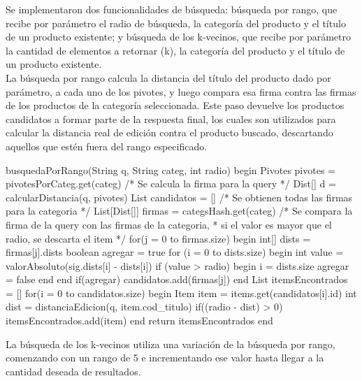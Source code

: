 Se implementaron dos funcionalidades de b\'usqueda: b\'usqueda por rango, que recibe por par\'ametro el radio de b\'usqueda, la categor\'ia del producto y el t\'itulo de un producto existente; y b\'usqueda de los k-vecinos, que recibe por par\'ametro la cantidad de elementos a retornar (k), la categor\'ia del producto y el t\'itulo de un producto existente.\\

La b\'usqueda por rango calcula la distancia del t\'itulo del producto dado por par\'ametro, a cada uno de los pivotes, y luego compara esa firma contra las firmas de los productos de la categor\'ia seleccionada. Este paso devuelve los productos candidatos a formar parte de la respuesta final, los cuales son utilizados para calcular la distancia real de edici\'on contra el producto buscado, descartando aquellos que est\'en fuera del rango especificado.\\

\begin{algorithm}[caption={B\'usqueda por rango}, label={alg4}]
busquedaPorRango(String q, String categ, int radio)
begin
 Pivotes pivotes = pivotesPorCateg.get(categ)
 /* Se calcula la firma para la query */
 Dist[] d = calcularDistancia(q, pivotes)
 List candidatos = []
 /* Se obtienen todas las firmas para la categoria */
 List[Dist[]] firmas = categsHash.get(categ)
 /* Se compara la firma de la query con las firmas de la categoria, 
  * si el valor es mayor que el radio, se descarta el item */
 for(j = 0 to firmas.size)
 begin
  int[] dists = firmas[j].dists
  boolean agregar = true
  for (i = 0 to dists.size)
  begin
   int value = valorAbsoluto(sig.dists[i] - dists[i])
   if (value > radio)
   begin
    i = dists.size
    agregar = false
   end
  end
  if(agregar)
   candidatos.add(firmas[j])
 end
 List itemsEncontrados = []
 for(i = 0 to candidatos.size)
 begin
  Item item = items.get(candidatos[i].id)
  int dist = distanciaEdicion(q, item.cod_titulo)
  if((radio - dist) > 0)
   itemsEncontrados.add(item)
 end
 return itemsEncontrados
end
\end{algorithm}

La b\'usqueda de los k-vecinos utiliza una variaci\'on de la b\'usqueda por rango, comenzando con un rango de 5 e incrementando ese valor hasta llegar a la cantidad deseada de resultados.\\

